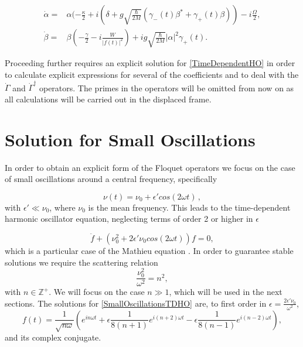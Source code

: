 \documentclass[reprint, amsmath,amssymb, aps,pra]{revtex4-1}
\begin{document}
\begin{align}\label{eq:displaced_frame}
\dot{\alpha} =& \alpha(-\frac{\kappa}{2}+i(\delta+g\sqrt{\frac{\hbar}{2M}}(\gamma_-(t) \beta^* + \gamma_+(t) \beta))-i\frac{\Omega}{2},\\
\dot{\beta} =& \beta(-\frac{\gamma}{2}-i\frac{W}{|f(t)|^2})+ig\sqrt{\frac{\hbar}{2M}}|\alpha|^2\gamma_+(t).
\end{align}




Proceeding further requires an explicit solution for
\eqref{TimeDependentHO} in order to calculate explicit expressions for several of the coefficients and to deal with the $\dot{\Gamma}$ and $\dot{\Gamma}^\dagger$ operators. The primes in the operators will be omitted
from now on as all calculations will be carried out in the displaced frame.


\section{Solution for Small Oscillations}\label{SolSmallOsc}
 
In order to obtain an explicit form of the Floquet operators we focus
on the case of small oscillations around a central frequency,
specifically

\begin{equation}
\nu(t) = \nu_0 + \epsilon' cos(2\omega t)\, ,
\end{equation}
with $\epsilon' \ll \nu_0$, where $\nu_0$ is the mean frequency. This
leads to the time-dependent harmonic oscillator equation, neglecting terms of order 2 or higher in $\epsilon$

\begin{equation}\label{SmallOscillationsTDHO}
\ddot{f} + (\nu_0^2 + 2\epsilon' \nu_0 cos(2\omega t))f = 0,
\end{equation}
which is a particular case of the Mathieu equation \cite{PiatekME}.
In order to guarantee stable solutions we require the scattering
relation
\begin{equation}
\frac{\nu_0^2}{\omega^2} = n^2,\label{scattering}
\end{equation}
with $n \in \mathbb{Z}^+$\cite{WardFT}. We will focus on the case
$n\gg 1$, which will be used in the next sections. The solutions for
\eqref{SmallOscillationsTDHO} are, to first order in
$\epsilon= \frac{2\epsilon' \nu_0}{\omega^2}$,
\begin{equation}\label{SmallOscillationsSolution}
f(t)=  \frac{1}{\sqrt{n\omega}}(e^{in\omega t}  + \epsilon \frac{1}{8(n+1)} e^{i(n+2) \omega t} - \epsilon \frac{1}{8(n-1)} e^{i(n-2) \omega t}),
\end{equation} and its complex conjugate.
\end{document}
